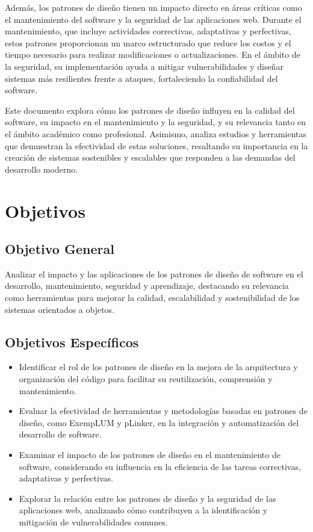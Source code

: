 \documentclass{article}
\begin{document}
Además, los patrones de diseño tienen un impacto directo en áreas críticas como el mantenimiento del software y la seguridad de las aplicaciones web. Durante el mantenimiento, que incluye actividades correctivas, adaptativas y perfectivas, estos patrones proporcionan un marco estructurado que reduce los costos y el tiempo necesario para realizar modificaciones o actualizaciones. En el ámbito de la seguridad, su implementación ayuda a mitigar vulnerabilidades y diseñar sistemas más resilientes frente a ataques, fortaleciendo la confiabilidad del software.

Este documento explora cómo los patrones de diseño influyen en la calidad del software, su impacto en el mantenimiento y la seguridad, y su relevancia tanto en el ámbito académico como profesional. Asimismo, analiza estudios y herramientas que demuestran la efectividad de estas soluciones, resaltando su importancia en la creación de sistemas sostenibles y escalables que responden a las demandas del desarrollo moderno.

\section{Objetivos}
\subsection{Objetivo General}
Analizar el impacto y las aplicaciones de los patrones de diseño de software en el desarrollo, mantenimiento, seguridad y aprendizaje, destacando su relevancia como herramientas para mejorar la calidad, escalabilidad y sostenibilidad de los sistemas orientados a objetos.

\subsection{Objetivos Específicos}
\begin{itemize}
    \item Identificar el rol de los patrones de diseño en la mejora de la arquitectura y organización del código para facilitar su reutilización, comprensión y mantenimiento.
    \item Evaluar la efectividad de herramientas y metodologías basadas en patrones de diseño, como ExempLUM y pLinker, en la integración y automatización del desarrollo de software.
    \item Examinar el impacto de los patrones de diseño en el mantenimiento de software, considerando su influencia en la eficiencia de las tareas correctivas, adaptativas y perfectivas.
    \item Explorar la relación entre los patrones de diseño y la seguridad de las aplicaciones web, analizando cómo contribuyen a la identificación y mitigación de vulnerabilidades comunes.
\end{itemize}
\end{document}
